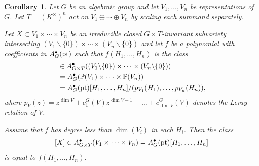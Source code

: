 \documentclass[12pt]{amsart}
\newcommand{\mb}{\mathbb}
\newcommand{\ol}{\overline}
\newcommand{\pt}{{\rm pt}}
\theoremstyle{plain}
\newtheorem{Cor}[Thm]{Corollary}
\theoremstyle{definition}
\theoremstyle{remark}
\begin{document}
\begin{Cor}
\label{SX}Let $G$ be an algebraic group and let $V_1,\ldots,V_n$ be representations of $G$. Let $T=(K^{\times})^n$ act on $V_1\oplus\cdots\oplus V_n$ by scaling each summand separately.

Let $X\subset V_1\times\cdots\times V_n$ be an irreducible closed $G \times T$-invariant subvariety intersecting $(V_1\backslash \{0\})\times\cdots\times (V_n\backslash \{0\})$ and let $f$ be a polynomial with coefficients in $A^\bullet_{G}(\pt)$ such that $f(H_1, \ldots, H_n)$ is the class
\begin{align*}
[X\cap (V_1\backslash \{0\})\times\cdots\times (V_n\backslash \{0\})] &\in A_{G\times T}^{\bullet}((V_1\backslash \{0\})\times\cdots\times (V_n\backslash \{0\})) \\
&= A_{G}^{\bullet}(\mb{P}(V_1)\times\cdots\times\mb{P}(V_n)) \\
&= A_{G}^{\bullet}(\pt)[H_1,\ldots,H_n]/(p_{V_1}(H_1),\ldots,p_{V_n}(H_n)),
\end{align*}
where $p_V(z) = z^{\dim V} + c_1^G(V) z^{\dim V - 1} + \ldots + c_{\dim V}^G(V)$ denotes the Leray relation of $V$.

Assume that $f$ has degree less than $\dim(V_i)$ in each $H_i$. Then the class \[[X] \in A^\bullet_{G \times T}(V_1 \times \cdots \times V_n) = A^\bullet_{G}(\pt)[H_1, \ldots, H_n]\] is equal to $f(H_1, \ldots, H_n)$.

\end{Cor}
\end{document}
